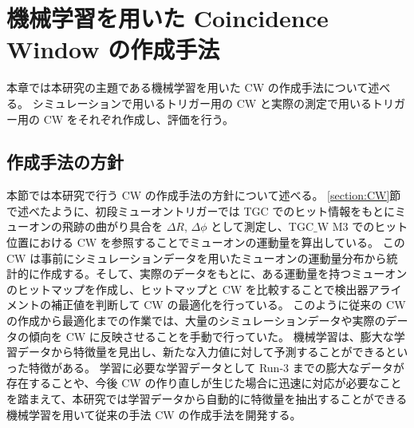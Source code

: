 \chapter{機械学習を用いた Coincidence Window の作成手法}
本章では本研究の主題である機械学習を用いた CW の作成手法について述べる。
シミュレーションで用いるトリガー用の CW と実際の測定で用いるトリガー用の CW をそれぞれ作成し、評価を行う。

\section{作成手法の方針}
本節では本研究で行う CW の作成手法の方針について述べる。
\ref{section:CW}節で述べたように、初段ミューオントリガーでは TGC でのヒット情報をもとにミューオンの飛跡の曲がり具合を $\Delta R$, $\Delta \phi$ として測定し、TGC$\_$W M3 でのヒット位置における CW を参照することでミューオンの運動量を算出している。
この CW は事前にシミュレーションデータを用いたミューオンの運動量分布から統計的に作成する。そして、実際のデータをもとに、ある運動量を持つミューオンのヒットマップを作成し、ヒットマップと CW を比較することで検出器アライメントの補正値を判断して CW の最適化を行っている。
このように従来の CW の作成から最適化までの作業では、大量のシミュレーションデータや実際のデータの傾向を CW に反映させることを手動で行っていた。
機械学習は、膨大な学習データから特徴量を見出し、新たな入力値に対して予測することができるといった特徴がある。
学習に必要な学習データとして Run-3 までの膨大なデータが存在することや、今後 CW の作り直しが生じた場合に迅速に対応が必要なことを踏まえて、本研究では学習データから自動的に特徴量を抽出することができる機械学習を用いて従来の手法 CW の作成手法を開発する。


